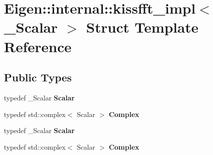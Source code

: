 \hypertarget{struct_eigen_1_1internal_1_1kissfft__impl}{}\section{Eigen\+:\+:internal\+:\+:kissfft\+\_\+impl$<$ \+\_\+\+Scalar $>$ Struct Template Reference}
\label{struct_eigen_1_1internal_1_1kissfft__impl}
\subsection*{Public Types}
\begin{DoxyCompactItemize}
\item 
\mbox{\label{struct_eigen_1_1internal_1_1kissfft__impl_aaa7ee28331132c45aabb28d7d22abee5}} 
typedef \+\_\+\+Scalar {\bfseries Scalar}
\item 
\mbox{\label{struct_eigen_1_1internal_1_1kissfft__impl_aa4cd6de1ff27455a7f5bc83feb771222}} 
typedef std\+::complex$<$ Scalar $>$ {\bfseries Complex}
\item 
\mbox{\label{struct_eigen_1_1internal_1_1kissfft__impl_aaa7ee28331132c45aabb28d7d22abee5}} 
typedef \+\_\+\+Scalar {\bfseries Scalar}
\item 
\mbox{\label{struct_eigen_1_1internal_1_1kissfft__impl_aa4cd6de1ff27455a7f5bc83feb771222}} 
typedef std\+::complex$<$ Scalar $>$ {\bfseries Complex}
\end{DoxyCompactItemize}
